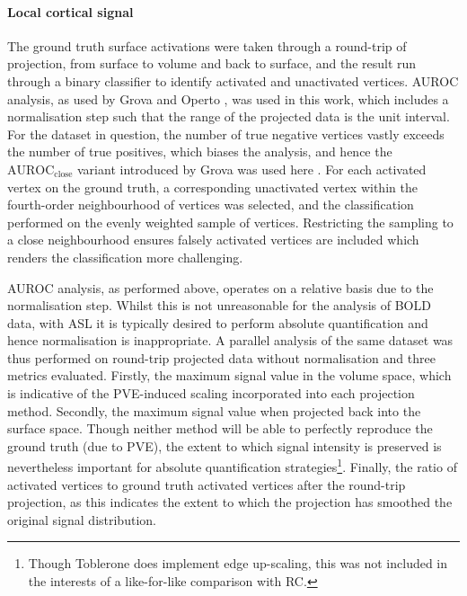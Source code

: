 \documentclass[review]{elsarticle}
\begin{document}
\paragraph{Local cortical signal} The ground truth surface activations were taken through a round-trip of projection, from surface to volume and back to surface, and the result run through a binary classifier to identify activated and unactivated vertices. AUROC analysis, as used by Grova and Operto \cite{Grova2006, Operto2008}, was used in this work, which includes a normalisation step such that the range of the projected data is the unit interval. For the dataset in question, the number of true negative vertices vastly exceeds the number of true positives, which biases the analysis, and hence the $\mathrm{AUROC}_{\mathrm{close}}$ variant introduced by Grova was used here \cite{Grova2006}. For each activated vertex on the ground truth, a corresponding unactivated vertex within the fourth-order neighbourhood of vertices was selected, and the classification performed on the evenly weighted sample of vertices. Restricting the sampling to a close neighbourhood ensures falsely activated vertices are included which renders the classification more challenging. 

AUROC analysis, as performed above, operates on a relative basis due to the normalisation step. Whilst this is not unreasonable for the analysis of BOLD data, with ASL it is typically desired to perform absolute quantification and hence normalisation is inappropriate. A parallel analysis of the same dataset was thus performed on round-trip projected data without normalisation and three metrics evaluated. Firstly, the maximum signal value in the volume space, which is indicative of the PVE-induced scaling incorporated into each projection method. Secondly, the maximum signal value when projected back into the surface space. Though neither method will be able to perfectly reproduce the ground truth (due to PVE), the extent to which signal intensity is preserved is nevertheless important for absolute quantification strategies\footnote{Though Toblerone does implement edge up-scaling, this was not included in the interests of a like-for-like comparison with RC.}. Finally, the ratio of activated vertices to ground truth activated vertices after the round-trip projection, as this indicates the extent to which the projection has smoothed the original signal distribution. 
\end{document}
